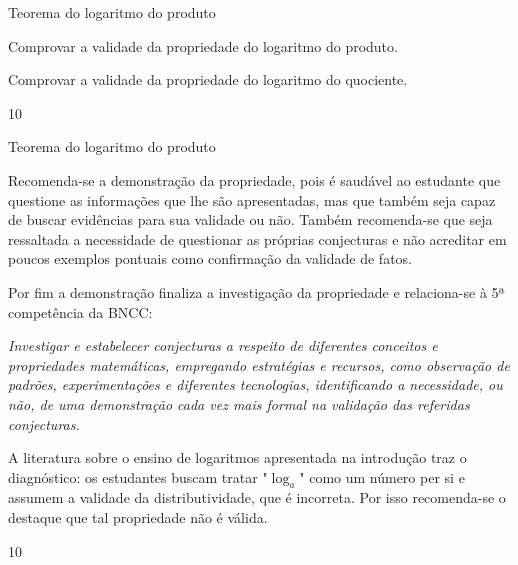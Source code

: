 \def\currentcolor{session4}
\begin{objectives}{Teorema do logaritmo do produto}
{
	Comprovar a validade da propriedade do logaritmo do produto.

	Comprovar a validade da propriedade do logaritmo do quociente.
}{1}{0}
\end{objectives}
\begin{sugestions}{Teorema do logaritmo do produto}
{
	Recomenda-se a demonstração da propriedade, pois é saudável ao estudante que questione as informações que lhe são apresentadas, mas que também seja capaz de buscar evidências para sua validade ou não. Também recomenda-se que seja ressaltada a necessidade de questionar as próprias conjecturas e não acreditar em poucos exemplos pontuais como confirmação da validade de fatos.

	Por fim a demonstração finaliza a investigação da propriedade e relaciona-se à 5ª competência da BNCC:

	\textit{Investigar e estabelecer conjecturas a respeito de diferentes conceitos e propriedades matemáticas, empregando estratégias e recursos, como observação de padrões, experimentações e diferentes tecnologias, identificando a necessidade, ou não, de uma demonstração cada vez mais formal na validação das referidas conjecturas.}

	A literatura sobre o ensino de logaritmos apresentada na introdução traz o diagnóstico: os estudantes buscam tratar "$\log_a$" como um número per si e assumem a validade da distributividade, que é incorreta. Por isso recomenda-se o destaque que tal propriedade não é válida.
}{1}{0}
\end{sugestions}
\clearmargin
